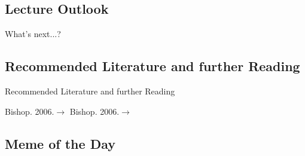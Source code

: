 \subsection{Lecture Outlook}

\begin{frame}{What's next...?}{}
\end{frame}


\subsection{Recommended Literature and further Reading}

\begin{frame}{Recommended Literature and further Reading}{}
	\footnotesize
	\begin{thebibliography}{2}
			{Bishop. 2006.}{$\rightarrow$ \href{http://users.isr.ist.utl.pt/~wurmd/Livros/school/Bishop\%20-\%20Pattern\%20Recognition\%20And\%20Machine\%20Learning\%20-\%20Springer\%20\%202006.pdf}{}}
			{Bishop. 2006.}{$\rightarrow$ \href{http://users.isr.ist.utl.pt/~wurmd/Livros/school/Bishop\%20-\%20Pattern\%20Recognition\%20And\%20Machine\%20Learning\%20-\%20Springer\%20\%202006.pdf}{}}
	\end{thebibliography}
\end{frame}


\subsection{Meme of the Day}

